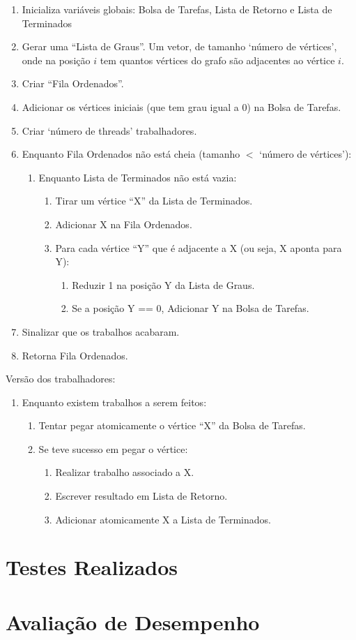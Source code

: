\documentclass[12pt]{article}
\begin{document}
\begin{enumerate}
	\item Inicializa variáveis globais:
		Bolsa de Tarefas, Lista de Retorno e Lista de Terminados
	\item Gerar uma ``Lista de Graus''.
		Um vetor, de tamanho `número de vértices',
		onde na posição $i$ tem quantos vértices do grafo são adjacentes
		ao vértice $i$.
	\item Criar ``Fila Ordenados''.
	\item Adicionar os vértices iniciais (que tem grau igual a 0)
		na Bolsa de Tarefas.
	\item Criar `número de threads' trabalhadores.
	\item Enquanto Fila Ordenados não está cheia
		(tamanho $<$ `número de vértices'):
	\begin{enumerate}
		\item Enquanto Lista de Terminados não está vazia:
		\begin{enumerate}
			\item Tirar um vértice ``X'' da Lista de Terminados.
			\item Adicionar X na Fila Ordenados.
			\item Para cada vértice ``Y'' que é adjacente a X
				(ou seja, X aponta para Y):
			\begin{enumerate}
				\item Reduzir 1 na posição Y da Lista de Graus.
				\item Se a posição Y == 0, Adicionar Y na Bolsa de Tarefas.
			\end{enumerate}
		\end{enumerate}
	\end{enumerate}
	\item Sinalizar que os trabalhos acabaram.
	\item Retorna Fila Ordenados.
\end{enumerate}

Versão dos trabalhadores:

\begin{enumerate}
	\item Enquanto existem trabalhos a serem feitos:
	\begin{enumerate}
		\item Tentar pegar atomicamente o vértice ``X''
			da Bolsa de Tarefas.
		\item Se teve sucesso em pegar o vértice:
		\begin{enumerate}
			\item Realizar trabalho associado a X.
			\item Escrever resultado em Lista de Retorno.
			\item Adicionar atomicamente X a Lista de Terminados.
		\end{enumerate}
	\end{enumerate}
\end{enumerate}

\newpage
\section{Testes Realizados}

\newpage
\section{Avaliação de Desempenho}
\end{document}

